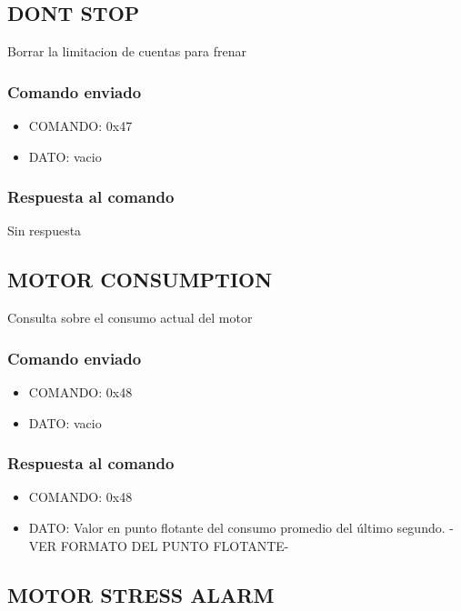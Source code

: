 \documentclass[a4paper,10pt]{article}
\begin{document}
\subsection{DONT STOP}
\label{dont_stop}

Borrar la limitacion de cuentas para frenar

\subsubsection*{Comando enviado}

\begin{itemize}
	\item{COMANDO:} 0x47
	\item{DATO:} vacio
\end{itemize}

\subsubsection*{Respuesta al comando}

Sin respuesta

\subsection{MOTOR CONSUMPTION}
\label{motor_consumption}

Consulta sobre el consumo actual del motor

\subsubsection*{Comando enviado}

\begin{itemize}
	\item{COMANDO:} 0x48
	\item{DATO:} vacio
\end{itemize}

\subsubsection*{Respuesta al comando}

\begin{itemize}
	\item{COMANDO:} 0x48
	\item{DATO:} Valor en punto flotante del consumo promedio del \'ultimo segundo. -VER FORMATO DEL PUNTO FLOTANTE-
\end{itemize}

\subsection{MOTOR STRESS ALARM}
\label{motor_stress_alarm}
\end{document}
